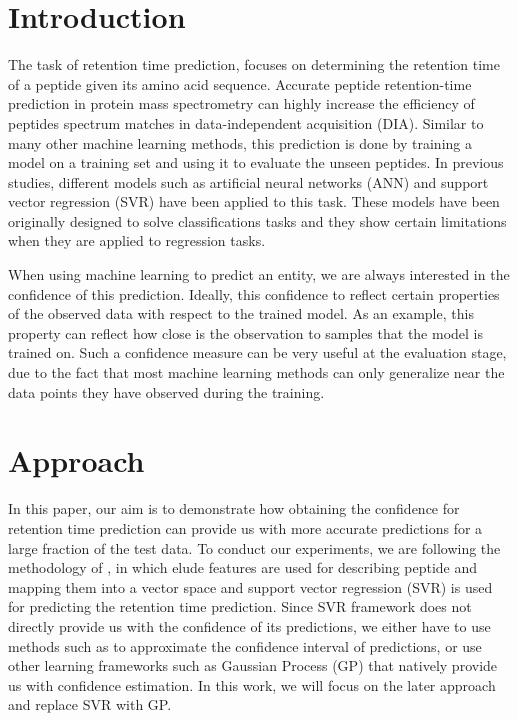 \documentclass{bioinfo}
\begin{document}
\section{Introduction}
\label{sec::intro}
The task of retention time prediction, focuses on determining the retention time of a peptide given its amino acid sequence. Accurate peptide retention-time prediction in protein mass spectrometry can highly increase the efficiency of peptides spectrum matches in data-independent acquisition (DIA). Similar to many other machine learning methods, this prediction is done by training a model on a training set and using it to evaluate the unseen peptides. In previous studies, different models such as artificial neural networks (ANN) \cite{Bishop:2006ui} and support vector regression (SVR) \cite{Bishop:2006ui} have been applied to this task. These models have been originally designed to solve classifications tasks and they show certain limitations when they are applied to regression tasks.

When using machine learning to predict an entity, we are always interested in the confidence of this prediction. Ideally, this confidence to reflect certain properties of the observed data with respect to the trained model. As an example, this property can reflect how close is the observation to samples that the model is trained on. Such a confidence measure can be very useful at the evaluation stage, due to the fact that most machine learning methods can only generalize near the data points they have observed during the training.

\section{Approach}
In this paper, our aim is to demonstrate how obtaining the confidence for retention time prediction can provide us with more accurate predictions for a large fraction of the test data. To conduct our experiments, we are following the methodology of \cite{elude}, in which elude features are used for describing peptide and mapping them into a vector space and support vector regression (SVR) is used for predicting the retention time prediction. Since SVR framework does not directly provide us with the confidence of its predictions, we either have to use methods such as \cite{DeBrabanter:2011he} to approximate the confidence interval of predictions, or use other learning frameworks such as Gaussian Process (GP) \cite{Rasmussen:2006vza} that natively provide us with confidence estimation. In this work, we will focus on the later approach and replace SVR with GP. 
\end{document}
